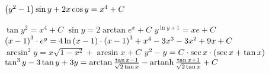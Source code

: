 \begin{enumsols}
		\item \( \left( y^2 - 1 \right) \sin{y} + 2x \cos{y} = x^4 + C \) %
		\item \( \tan{y^2} = x^4 + C \) %
		\itemstar \( \sin{y} = 2 \arctan{e^{x}} + C \) %
		\itemstar \( y^{\ln{y} + 1} = xe + C \) %
		\itemstar \( \left( x-1 \right)^3 \cdot e^{y} = 4\ln\left( x - 1 \right) \cdot \left( x-1 \right)^3 + x^4 - 3x^3 - 3x^2 + 9x + C \) %
		\label{sol:firstorder:separable2}
		\itemstar \( \arcsin^2{y} = x \sqrt{1 - x^2} + \arcsin{x} + C \) %
		\itemstar \( y^2 - y = C \cdot \sec{x} \cdot \left( \sec{x} + \tan{x} \right) \) %
		\itemstar \( \tan^3{y} - 3\tan{y} + 3y = \arctan{\frac{\tan{x} - 1}{\sqrt{2 \tan{x}}}} - \operatorname{artanh}{\frac{\tan{x} + 1}{\sqrt{2 \tan{x}}}} + C \) %


\end{enumsols}
